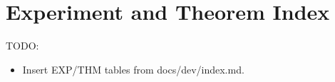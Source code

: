 \section{Experiment and Theorem Index}

TODO:
\begin{itemize}
\item Insert EXP/THM tables from docs/dev/index.md.
\end{itemize}
